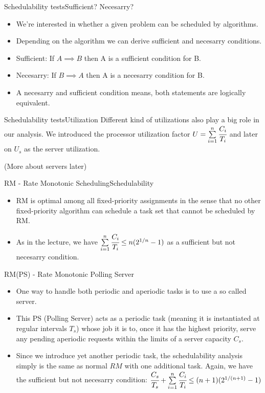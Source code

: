\begin{frame}{Schedulability tests}{Sufficient? Necesarry?}
    \begin{itemize}
        \item We're interested in whether a given problem can be scheduled by algorithms.
        \item Depending on the algorithm we can derive sufficient and necesarry conditions.
        \item[]\alert{Sufficient:} If $A \implies B$ then A is a sufficient condition for B.
        \item[]\alert{Necesarry:} If $B \implies A$ then A is a necesarry condition for B.
        \item A necesarry and sufficient condition means, both statements are logically equivalent.
    \end{itemize}
\end{frame}
\begin{frame}{Schedulability tests}{Utilization}
    Different kind of utilizations also play a big role in our analysis. We introduced the \alert{processor utilization factor} $U = \sum\limits_{i=1}^{n}\cfrac{C_i}{T_i}$ and later on $U_s$ as the server utilization.

    (More about servers later)
\end{frame}
\begin{frame}{RM - Rate Monotonic Scheduling}{Schedulability}
\begin{itemize}
    \item RM is optimal among all fixed-priority assignments in the sense that no other fixed-priority algorithm can schedule a task set that cannot be scheduled by RM.
    \item As in the lecture, we have $\sum\limits_{i=1}^{n}\cfrac{C_i}{T_i} \leq n(2^{1/n}-1)$ as a \alert{sufficient} but not \alert{necesarry} condition.
\end{itemize}
\end{frame}
\begin{frame}{RM(PS) - Rate Monotonic Polling Server}
    \begin{itemize}
        \item One way to handle both periodic and aperiodic tasks is to use a so called server.
        \item This PS (Polling Server) acts as a periodic task (meaning it is instantiated at regular intervals $T_s$) whose job it is to, once it has the highest priority, serve any pending aperiodic requests within the limits of a server capacity $C_s$.
        \item Since we introduce yet another periodic task, the schedulability analysis simply is the same as normal $RM$ with one additional task. Again, we have the \alert{sufficient} but not \alert{necesarry} condition: $\cfrac{C_s}{T_s} + \sum\limits_{i=1}^{n}\cfrac{C_i}{T_i} \leq (n+1)(2^{1/(n+1)}-1)$
    \end{itemize}
\end{frame}

